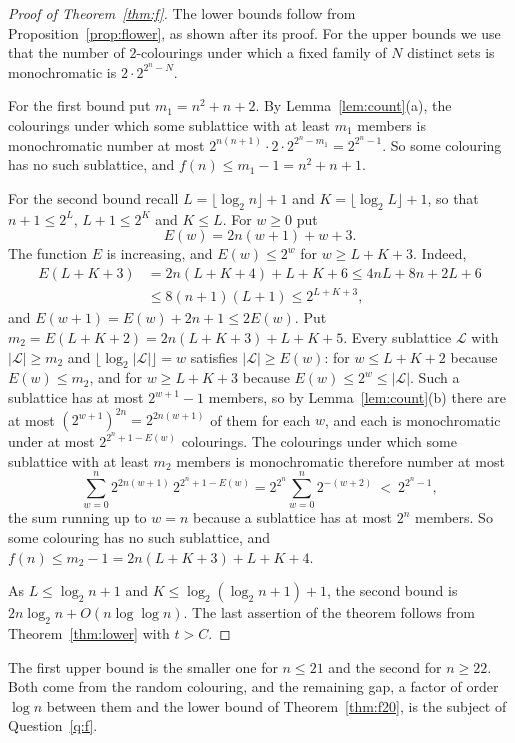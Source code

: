 \documentclass[11pt,reqno]{amsart}
\numberwithin{equation}{section}
\theoremstyle{plain}
\theoremstyle{definition}
\theoremstyle{remark}
\newcommand{\cL}{\mathcal{L}}
\begin{document}
\begin{proof}[Proof of Theorem~\ref{thm:f}]
The lower bounds follow from Proposition~\ref{prop:flower}, as shown
after its proof. For the upper bounds we use that the number of
$2$-colourings under which a fixed family of $N$ distinct sets is
monochromatic is $2\cdot2^{2^{n}-N}$.

For the first bound put $m_1=n^{2}+n+2$. By Lemma~\ref{lem:count}(a),
the colourings under which some sublattice with at least $m_1$ members is
monochromatic number at most $2^{n(n+1)}\cdot2\cdot2^{2^{n}-m_1}=
2^{2^{n}-1}$. So some colouring has no such sublattice, and $f(n)\le
m_1-1=n^{2}+n+1$.

For the second bound recall $L=\lfloor\log_2n\rfloor+1$ and
$K=\lfloor\log_2L\rfloor+1$, so that $n+1\le2^{L}$, $L+1\le2^{K}$ and
$K\le L$. For $w\ge0$ put
\[
E(w)=2n(w+1)+w+3 .
\]
The function $E$ is increasing, and $E(w)\le2^{w}$ for $w\ge L+K+3$.
Indeed,
\begin{align*}
E(L+K+3)&=2n(L+K+4)+L+K+6\le4nL+8n+2L+6\\
&\le8(n+1)(L+1)\le2^{L+K+3},
\end{align*}
and $E(w+1)=E(w)+2n+1\le2E(w)$. Put $m_2=E(L+K+2)=2n(L+K+3)+L+K+5$.
Every sublattice $\cL$ with $|\cL|\ge m_2$ and $\lfloor\log_2|\cL|\rfloor
=w$ satisfies $|\cL|\ge E(w)$: for $w\le L+K+2$ because $E(w)\le m_2$,
and for $w\ge L+K+3$ because $E(w)\le2^{w}\le|\cL|$. Such a sublattice
has at most $2^{w+1}-1$ members, so by Lemma~\ref{lem:count}(b) there are
at most $(2^{w+1})^{2n}=2^{2n(w+1)}$ of them for each $w$, and each is
monochromatic under at most $2^{2^{n}+1-E(w)}$ colourings. The colourings
under which some sublattice with at least $m_2$ members is monochromatic
therefore number at most
\[
\sum_{w=0}^{n}2^{2n(w+1)}\,2^{2^{n}+1-E(w)}
=2^{2^{n}}\sum_{w=0}^{n}2^{-(w+2)}\ <\ 2^{2^{n}-1},
\]
the sum running up to $w=n$ because a sublattice has at most $2^{n}$
members. So some colouring has no such sublattice, and $f(n)\le
m_2-1=2n(L+K+3)+L+K+4$.

As $L\le\log_2n+1$ and $K\le\log_2(\log_2n+1)+1$, the second bound is
$2n\log_2n+O(n\log\log n)$. The last assertion of the theorem follows
from Theorem~\ref{thm:lower} with $t>C$.
\end{proof}

The first upper bound is the smaller one for $n\le21$ and the second for
$n\ge22$. Both come from the random colouring, and the remaining gap, a
factor of order $\log n$ between them and the lower bound of
Theorem~\ref{thm:f20}, is the subject of Question~\ref{q:f}.
\end{document}
